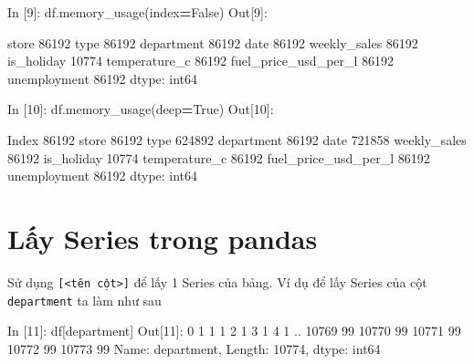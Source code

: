 \documentclass[
]{book}
\newenvironment{Shaded}{\begin{snugshade}}{\end{snugshade}}
\newcommand{\BuiltInTok}[1]{#1}
\newcommand{\DecValTok}[1]{\textcolor[rgb]{0.00,0.00,0.81}{#1}}
\newcommand{\NormalTok}[1]{#1}
\newcommand{\OperatorTok}[1]{\textcolor[rgb]{0.81,0.36,0.00}{\textbf{#1}}}
\newcommand{\StringTok}[1]{\textcolor[rgb]{0.31,0.60,0.02}{#1}}
\newcommand{\VariableTok}[1]{\textcolor[rgb]{0.00,0.00,0.00}{#1}}
\begin{document}
\begin{Shaded}
\begin{Highlighting}[]
\NormalTok{In [}\DecValTok{9}\NormalTok{]: df.memory\_usage(index}\OperatorTok{=}\VariableTok{False}\NormalTok{)}
\NormalTok{Out[}\DecValTok{9}\NormalTok{]: }

\NormalTok{store                   }\DecValTok{86192}
\BuiltInTok{type}                    \DecValTok{86192}
\NormalTok{department              }\DecValTok{86192}
\NormalTok{date                    }\DecValTok{86192}
\NormalTok{weekly\_sales            }\DecValTok{86192}
\NormalTok{is\_holiday              }\DecValTok{10774}
\NormalTok{temperature\_c           }\DecValTok{86192}
\NormalTok{fuel\_price\_usd\_per\_l    }\DecValTok{86192}
\NormalTok{unemployment            }\DecValTok{86192}
\NormalTok{dtype: int64}

\NormalTok{In [}\DecValTok{10}\NormalTok{]: df.memory\_usage(deep}\OperatorTok{=}\VariableTok{True}\NormalTok{) }
\NormalTok{Out[}\DecValTok{10}\NormalTok{]: }

\NormalTok{Index                    }\DecValTok{86192}
\NormalTok{store                    }\DecValTok{86192}
\BuiltInTok{type}                    \DecValTok{624892}
\NormalTok{department               }\DecValTok{86192}
\NormalTok{date                    }\DecValTok{721858}
\NormalTok{weekly\_sales             }\DecValTok{86192}
\NormalTok{is\_holiday               }\DecValTok{10774}
\NormalTok{temperature\_c            }\DecValTok{86192}
\NormalTok{fuel\_price\_usd\_per\_l     }\DecValTok{86192}
\NormalTok{unemployment             }\DecValTok{86192}
\NormalTok{dtype: int64}
\end{Highlighting}
\end{Shaded}

\section{Lấy Series trong pandas}\label{lux1ea5y-series-trong-pandas}

Sử dụng \texttt{{[}\textless{}tên\ cột\textgreater{}{]}} để lấy 1 Series của bảng. Ví dụ để lấy Series của cột \texttt{department} ta làm như sau

\begin{Shaded}
\begin{Highlighting}[]
\NormalTok{In [}\DecValTok{11}\NormalTok{]: df[}\StringTok{\textquotesingle{}department\textquotesingle{}}\NormalTok{]}
\NormalTok{Out[}\DecValTok{11}\NormalTok{]: }
\DecValTok{0}         \DecValTok{1}
\DecValTok{1}         \DecValTok{1}
\DecValTok{2}         \DecValTok{1}
\DecValTok{3}         \DecValTok{1}
\DecValTok{4}         \DecValTok{1}
\NormalTok{         ..}
\DecValTok{10769}    \DecValTok{99}
\DecValTok{10770}    \DecValTok{99}
\DecValTok{10771}    \DecValTok{99}
\DecValTok{10772}    \DecValTok{99}
\DecValTok{10773}    \DecValTok{99}
\NormalTok{Name: department, Length: }\DecValTok{10774}\NormalTok{, dtype: int64}
\end{Highlighting}
\end{Shaded}
\end{document}
